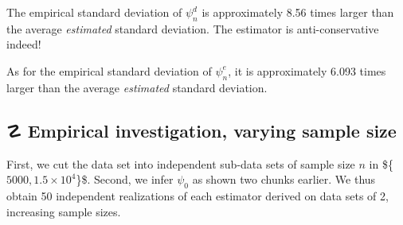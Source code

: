 \documentclass[11pt,openright,twoside]{book}
\newenvironment{Shaded}{\begin{snugshade}}{\end{snugshade}}
\newcommand{\DataTypeTok}[1]{\textcolor[rgb]{0.13,0.29,0.53}{#1}}
\newcommand{\DecValTok}[1]{\textcolor[rgb]{0.00,0.00,0.81}{#1}}
\newcommand{\FloatTok}[1]{\textcolor[rgb]{0.00,0.00,0.81}{#1}}
\newcommand{\KeywordTok}[1]{\textcolor[rgb]{0.13,0.29,0.53}{\textbf{#1}}}
\newcommand{\NormalTok}[1]{#1}
\newcommand{\OperatorTok}[1]{\textcolor[rgb]{0.81,0.36,0.00}{\textbf{#1}}}
\newcommand{\StringTok}[1]{\textcolor[rgb]{0.31,0.60,0.02}{#1}}
\DeclareRobustCommand{\stixdanger}{%
  {\usefont{U}{stixbbit}{m}{it}\symbol{"F6}}%
}
\theoremstyle{definition}
\theoremstyle{definition}
\theoremstyle{definition}
\theoremstyle{remark}
\begin{document}
The empirical standard deviation of \(\psi_{n}^{d}\) is approximately
8.56 times larger than the average \emph{estimated}
standard deviation. The estimator is anti-conservative indeed!

As for the empirical standard deviation of \(\psi_{n}^{e}\), it is approximately
6.093 times larger than the average \emph{estimated}
standard deviation.

\hypertarget{empirical-inves-Gcomp-varying}{%
\subsection{\texorpdfstring{☡ \stixdanger{} Empirical investigation, varying sample size}{☡  Empirical investigation, varying sample size}}\label{empirical-inves-Gcomp-varying}}

\begin{Shaded}
\end{Shaded}

First, we cut the data set into independent sub-data sets of sample size \(n\)
in \$\{\(5000, \ensuremath{1.5\times 10^{4}}\)\}\$. Second, we infer \(\psi_{0}\) as shown two chunks
earlier. We thus obtain 50 independent realizations
of each estimator derived on data sets of 2, increasing
sample sizes.
\end{document}
